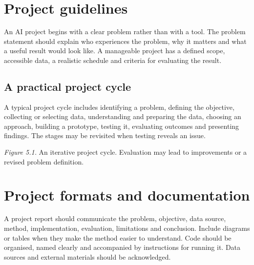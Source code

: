 \documentclass[11pt,openany,oneside]{book}
\begin{document}
\section{Project guidelines}
An AI project begins with a clear problem rather than with a tool. The problem statement should explain who experiences the problem, why it matters and what a useful result would look like. A manageable project has a defined scope, accessible data, a realistic schedule and criteria for evaluating the result.

\subsection{A practical project cycle}
A typical project cycle includes identifying a problem, defining the objective, collecting or selecting data, understanding and preparing the data, choosing an approach, building a prototype, testing it, evaluating outcomes and presenting findings. The stages may be revisited when testing reveals an issue.

\begin{center}
\end{center}
\textit{Figure 5.1.} An iterative project cycle. Evaluation may lead to improvements or a revised problem definition.

\section{Project formats and documentation}
A project report should communicate the problem, objective, data source, method, implementation, evaluation, limitations and conclusion. Include diagrams or tables when they make the method easier to understand. Code should be organised, named clearly and accompanied by instructions for running it. Data sources and external materials should be acknowledged.
\end{document}
